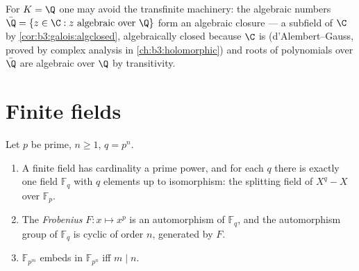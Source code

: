 \begin{remark}\label{rem:b3:galois:closureexamples}
For $K = \Q$ one may avoid the transfinite machinery: the
algebraic numbers $\bar\Q = \{z \in \C : z \text{ algebraic over
} \Q\}$ form an algebraic closure --- a subfield of $\C$ by
\cref{cor:b3:galois:algclosed}, algebraically closed because $\C$
is (d'Alembert--Gauss, proved by complex analysis in
\cref{ch:b3:holomorphic}) and roots of polynomials over $\bar\Q$
are algebraic over $\Q$ by transitivity.
\end{remark}

\section{Finite fields}

\begin{theorem}\label{thm:b3:galois:finitefields}
Let $p$ be prime, $n \geq 1$, $q = p^n$.
\begin{enumerate}
  \item A finite field has cardinality a prime power, and for
        each $q$ there is exactly one field $\mathbb F_q$ with
        $q$ elements up to isomorphism: the splitting field of
        $X^q - X$ over $\mathbb F_p$.
  \item The \emph{Frobenius} $F
        \colon x \mapsto x^p$ is an automorphism of $\mathbb
        F_q$, and the automorphism group of $\mathbb F_q$ is
        cyclic of order $n$, generated by $F$.
  \item $\mathbb F_{p^m}$ embeds in $\mathbb F_{p^n}$ iff $m \mid
        n$.
\end{enumerate}
\end{theorem}

